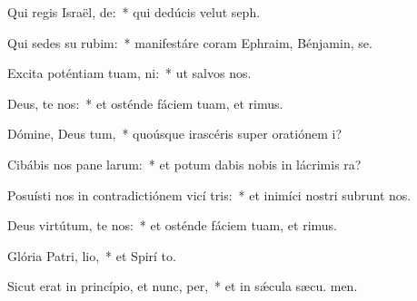\item Qui regis Israël, de:~* qui dedúcis velut  seph.
\item Qui sedes su rubim:~* manifestáre coram Ephraim, Bénjamin,  se.
\item Excita poténtiam tuam,  ni:~* ut salvos  nos.
\item Deus, te nos:~* et osténde fáciem tuam, et  rimus.
\item Dómine, Deus tum,~* quoúsque irascéris super oratiónem  i?
\item Cibábis nos pane larum:~* et potum dabis nobis in lácrimis  ra?
\item Posuísti nos in contradictiónem vicí tris:~* et inimíci nostri subrunt nos.
\item Deus virtútum, te nos:~* et osténde fáciem tuam, et  rimus.
\item Glória Patri,  lio,~* et Spirí to.
\item Sicut erat in princípio, et nunc,  per,~* et in sǽcula sæcu. men.
